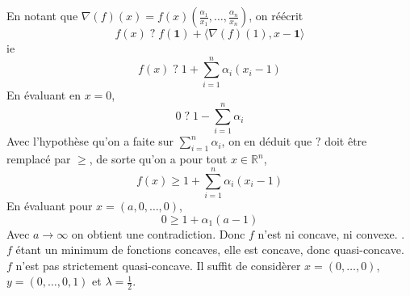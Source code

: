 \documentclass{report}
\begin{document}
En notant que $\nabla(f)(x)=f(x)(\frac{\alpha_1}{x_1},\ldots,\frac{\alpha_n}{x_n})$, on réécrit
$$ f(x) \;?\; f(\mathbf 1) + \langle \nabla(f)(1),x- \mathbf 1\rangle$$
ie 
$$ f(x) \;?\; 1 + \sum_{i=1}^n \alpha_i(x_i-1)$$
 En évaluant en $x=0$, $$0 \;?\; 1 -\sum_{i=1}^n \alpha_i  $$
 Avec l'hypothèse qu'on a faite sur $\displaystyle \sum_{i=1}^n \alpha_i$, on en déduit que $?$ doit être remplacé par $\geq$, de sorte qu'on a pour tout $x\in \mathbb R^n$, $$f(x)\geq  1 + \sum_{i=1}^n \alpha_i(x_i-1)$$
 En évaluant pour $x=(a,0,\ldots,0)$, $$0\geq 1+\alpha_1(a-1)$$
 Avec $a\to \infty$ on obtient une contradiction. Donc $f$ n'est ni concave, ni convexe.
 \newline {}. $f$ étant un minimum de fonctions concaves, elle est concave, donc quasi-concave. \newline
$f$ n'est pas strictement quasi-concave. Il suffit de considèrer $x=(0,\ldots,0)$, $y=(0,\ldots,0,1)$ et $\lambda=\frac{1}{2}$.
\end{document}
